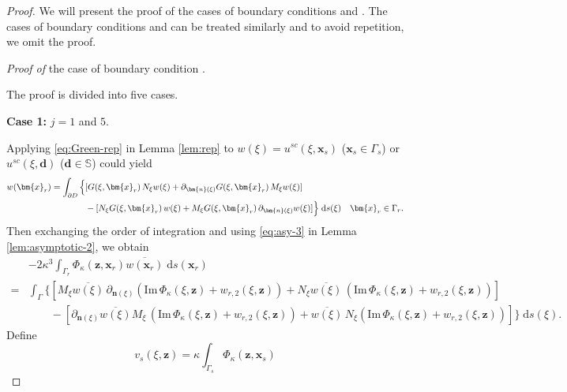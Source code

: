 \documentclass[10pt,a4paper]{article}
\numberwithin{equation}{section}
\begin{document}
   \begin{proof}
     We will present the proof of the cases  of boundary conditions  \uppercase\expandafter{} and  \uppercase\expandafter{}. The cases of boundary conditions  \uppercase\expandafter{} and  \uppercase\expandafter{} can be treated similarly and to avoid repetition, we omit the proof.
     
\emph{Proof of}  the case of boundary condition \uppercase\expandafter{}.
     
       The proof is divided into five cases.

       \textbf{Case 1:} $j=1$ and $5$. 
       
       
  Applying \eqref{eq:Green-rep} in Lemma \ref{lem:rep} to $w(\xi)=u^{sc}(\xi,\bm{x}_s)$ ($ \bm{ x }_s \in \Gamma_s$) or $u^{sc}(\xi,\bm{d})$ ($\bm{d}\in \mathbb{S} $) could yield
  \begin{align}
    \notag
w(\bm{x}_r) = 
\int_{\partial D}\Big\{ &[G(\xi,\bm{x}_r) \,N_{\xi} w(\xi )
                + \partial_{\bm{n}(\xi)}G(\xi,\bm{x}_r)\, M_{\xi} w(\xi )  ]\\
    \label{eq:eq:Green-rep1}
&-[N_{\xi}G(\xi,\bm{x}_r)\, w(\xi )
+ M_{\xi}G(\xi,\bm{x}_r) \,\partial_{\bm{n}(\xi)} w(\xi ) ] 
  \Big\} {\;\rm d}s(\xi) \quad \bm{x}_r\in\Gamma_r.
  \end{align}
  Then exchanging the order of integration and using \eqref{eq:asy-3} in  Lemma \ref{lem:asymptotic-2}, we obtain
  \begin{align*}
   & -2 \kappa^3 \int_{ \Gamma_{r} } \Phi_{\kappa}(\bm{ z },\bm{ x }_r) \overline{w(\bm{ x }_{r})} \;\mathrm{d}s(\bm{ x }_r) \\
    = & \int_{ \Gamma } \Big\{ [M_{\xi}\overline{w(\xi)} \, \partial_{\bm{n}(\xi )}
        (\mathrm{Im}\, \Phi_{\kappa}(\xi,\bm{z}) + w_{r,2}(\xi,\bm{z}) )
        + N_{\xi } \overline{w(\xi)}\,
         (\mathrm{Im}\, \Phi_{\kappa}(\xi,\bm{z}) + w_{r,2}(\xi,\bm{z}) ) ]  \\
   & \qquad - [ \partial_{\bm{n}(\xi )}\overline{w(\xi)} M_{\xi }\,
     ( \mathrm{Im}\, \Phi_{\kappa}(\xi,\bm{z}) + w_{r,2}(\xi,\bm{z})  )
     +  \overline{w(\xi)} \, N_{\xi }
     ( \mathrm{Im}\, \Phi_{\kappa}(\xi,\bm{z}) + w_{r,2}(\xi,\bm{z}) )
     ]  \Big\} \;\mathrm{d}s(\xi).
  \end{align*}
  Define
  \begin{equation}
    \label{eq:vsd}
    v_{s}(\xi , \bm{ z })  =  \kappa \int_{ \Gamma_{s} } \Phi_{\kappa}(\bm{ z }, \bm{ x }_s)

\end{equation}
\end{proof}
\end{document}
